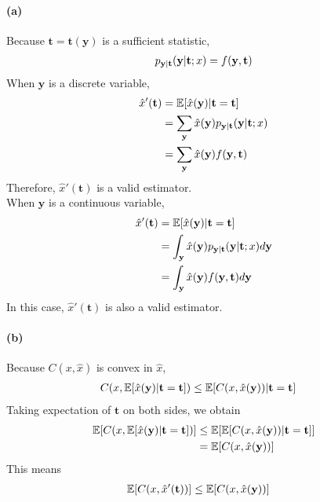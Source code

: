 \documentclass{article}
\begin{document}
\paragraph{(a)}
Because $\mathbf{t}=\mathbf{t}(\mathbf{y})$ is a sufficient statistic,
\begin{align}
	p_{\mathbf{y}|\mathbf{t}}(\mathbf{y}|\mathbf{t};x)=f(\mathbf{y},\mathbf{t})\notag
\end{align}
When $\mathbf{y}$ is a discrete variable,
\begin{align}
	\hat{x}'(\mathbf{t})&=\mathbb{E}[\hat{x}(\mathbf{y})|\mathbf{t}=\mathbf{t}]\notag\\
	&=\sum_{\mathbf{y}}\hat{x}(\mathbf{y})p_{\mathbf{y}|\mathbf{t}}(\mathbf{y}|\mathbf{t};x)\notag\\
	&=\sum_{\mathbf{y}}\hat{x}(\mathbf{y})f(\mathbf{y},\mathbf{t})\notag
\end{align}
Therefore, $\hat{x}'(\mathbf{t})$ is a valid estimator.\\
When $\mathbf{y}$ is a continuous variable,
\begin{align}
	\hat{x}'(\mathbf{t})&=\mathbb{E}[\hat{x}(\mathbf{y})|\mathbf{t}=\mathbf{t}]\notag\\
	&=\int_{\mathbf{y}}\hat{x}(\mathbf{y})p_{\mathbf{y}|\mathbf{t}}(\mathbf{y}|\mathbf{t};x)d\mathbf{y}\notag\\
	&=\int_{\mathbf{y}}\hat{x}(\mathbf{y})f(\mathbf{y},\mathbf{t})d\mathbf{y}\notag
\end{align}
In this case, $\hat{x}'(\mathbf{t})$ is also a valid estimator.
\paragraph{(b)}
Because $C(x,\hat{x})$ is convex in $\hat{x}$,
\begin{align}
	C(x,\mathbb{E}[\hat{x}(\mathbf{y})|\mathbf{t}=\mathbf{t}])&\le \mathbb{E}[C(x,\hat{x}(\mathbf{y}))|\mathbf{t}=\mathbf{t}]\notag
\end{align}
Taking expectation of $\mathbf{t}$ on both sides, we obtain
\begin{align}
	\mathbb{E}[C(x,\mathbb{E}[\hat{x}(\mathbf{y})|\mathbf{t}=\mathbf{t}])]&\le \mathbb{E}[\mathbb{E}[C(x,\hat{x}(\mathbf{y}))|\mathbf{t}=\mathbf{t}]]\notag\\
	&=\mathbb{E}[C(x,\hat{x}(\mathbf{y}))]\notag
\end{align}
This means
\begin{align}
	\mathbb{E}[C(x,\hat{x}'(\mathbf{t}))]&\le \mathbb{E}[C(x,\hat{x}(\mathbf{y}))]\notag
\end{align}
\end{document}
